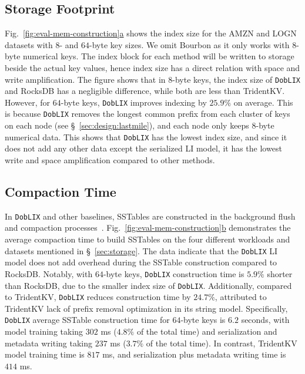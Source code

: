 \subsection{Storage Footprint}
\label{sec:eval:storage}

\label{sec:storage}
Fig.~\hyperref[fig:eval-mem-construction]{\ref*{fig:eval-mem-construction}a} shows the index size for the AMZN and LOGN datasets with $8$- and $64$-byte key sizes. We omit Bourbon as it only works with $8$-byte numerical keys. The index block for each method will be written to storage beside the actual key values, hence index size has a direct relation with space and write amplification. The figure shows that in $8$-byte keys, the index size of \texttt{DobLIX} and RocksDB has a negligible difference, while both are less than TridentKV. However, for $64$-byte keys, \texttt{DobLIX} improves indexing by $25.9\%$ on average. This is because \texttt{DobLIX} removes the longest common prefix from each cluster of keys on each node (see \S~\ref{sec:design:lastmile}), and each node only keeps $8$-byte numerical data. This shows that \texttt{DobLIX} has the lowest index size, and since it does not add any other data except the serialized LI model, it has the lowest write and space amplification compared to other methods.

\subsection{Compaction Time}
In \texttt{DobLIX} and other baselines, SSTables are constructed in the background flush and compaction processes~\cite{yu2024caas}. Fig.~\hyperref[fig:eval-mem-construction]{\ref*{fig:eval-mem-construction}b} demonstrates the average compaction time to build SSTables on the four different workloads and datasets mentioned in \S~\ref{sec:storage}.
The data indicate that the \texttt{DobLIX} LI model does not add overhead during the SSTable construction compared to RocksDB. Notably, with $64$-byte keys, \texttt{DobLIX} construction time is $5.9\%$ shorter than RocksDB, due to the smaller index size of \texttt{DobLIX}. Additionally, compared to TridentKV, \texttt{DobLIX} reduces construction time by $24.7\%$, attributed to TridentKV lack of prefix removal optimization in its string model. Specifically, \texttt{DobLIX} average SSTable construction time for $64$-byte keys is $6.2$ seconds, with model training taking $302$ ms ($4.8\%$ of the total time) and serialization and metadata writing taking $237$ ms ($3.7\%$ of the total time). In contrast, TridentKV model training time is $817$ ms, and serialization plus metadata writing time is $414$ ms. 



